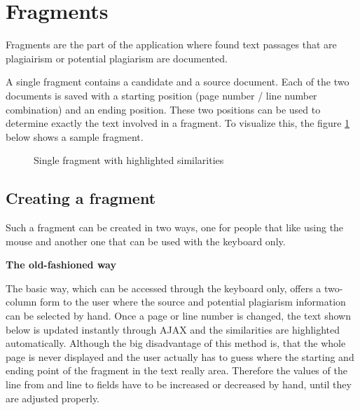 \section{Fragments}

Fragments are the part of the application where found text passages that are plagiairism or potential plagiarism are documented.

A single fragment contains a candidate and a source document. Each of the two documents is saved with a starting position (page number / line number combination) and an ending position. These two positions can be used to determine exactly the text involved in a fragment. To visualize this, the figure \ref{fig:single-fragment} below shows a sample fragment.

\begin{figure}[!h]
  \centering
  \caption{Single fragment with highlighted similarities}
  \label{fig:single-fragment}
\end{figure}

\subsection{Creating a fragment}

Such a fragment can be created in two ways, one for people that like using the mouse and another one that can be used with the keyboard only.

\textbf{The old-fashioned way}

The basic way, which can be accessed through the keyboard only, offers a two-column form to the user where the source and potential plagiarism information can be selected by hand. Once a page or line number is changed, the text shown below is updated instantly through AJAX and the similarities are highlighted automatically. Although the big disadvantage of this method is, that the whole page is never displayed and the user actually has to guess where the starting and ending point of the fragment in the text really area. Therefore the values of the line from and line to fields have to be increased or decreased by hand, until they are adjusted properly.

